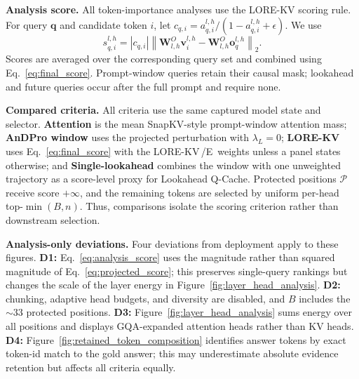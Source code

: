 \documentclass{article} %
\newcommand{\lorekvE}{LORE-KV\,/E}
\begin{document}
\textbf{Analysis score.}
All token-importance analyses use the LORE-KV scoring rule. For query $\mathbf{q}$ and candidate token $i$, let
$c_{q,i}=a^{l,h}_{q,i}/(1-a^{l,h}_{q,i}+\epsilon)$. We use
\begin{equation}
s^{l,h}_{q,i}
=
\left|c_{q,i}\right|
\left\|
\mathbf{W}^{O}_{l,h}\mathbf{v}^{l,h}_{i}
-
\mathbf{W}^{O}_{l,h}\mathbf{o}^{l,h}_{q}
\right\|_2 .
\label{eq:analysis_score}
\end{equation}
Scores are averaged over the corresponding query set and combined using Eq.~\eqref{eq:final_score}. Prompt-window queries retain their causal mask; lookahead and future queries occur after the full prompt and require none.

\textbf{Compared criteria.}
All criteria use the same captured model state and selector. \textbf{Attention} is the mean SnapKV-style prompt-window attention mass; \textbf{AnDPro window} uses the projected perturbation with $\lambda_L{=}0$; \textbf{LORE-KV} uses Eq.~\eqref{eq:final_score} with the \lorekvE\ weights unless a panel states otherwise; and \textbf{Single-lookahead} combines the window with one unweighted trajectory as a score-level proxy for Lookahead Q-Cache. Protected positions $\mathcal{P}$ receive score $+\infty$, and the remaining tokens are selected by uniform per-head top-$\min(B,n)$. Thus, comparisons isolate the scoring criterion rather than downstream selection.

\textbf{Analysis-only deviations.}
Four deviations from deployment apply to these figures. \textbf{D1:} Eq.~\eqref{eq:analysis_score} uses the magnitude rather than squared magnitude of Eq.~\eqref{eq:projected_score}; this preserves single-query rankings but changes the scale of the layer energy in Figure~\ref{fig:layer_head_analysis}. \textbf{D2:} chunking, adaptive head budgets, and diversity are disabled, and $B$ includes the ${\sim}33$ protected positions. \textbf{D3:} Figure~\ref{fig:layer_head_analysis} sums energy over all positions and displays GQA-expanded attention heads rather than KV heads. \textbf{D4:} Figure~\ref{fig:retained_token_composition} identifies answer tokens by exact token-id match to the gold answer; this may underestimate absolute evidence retention but affects all criteria equally.
\end{document}
